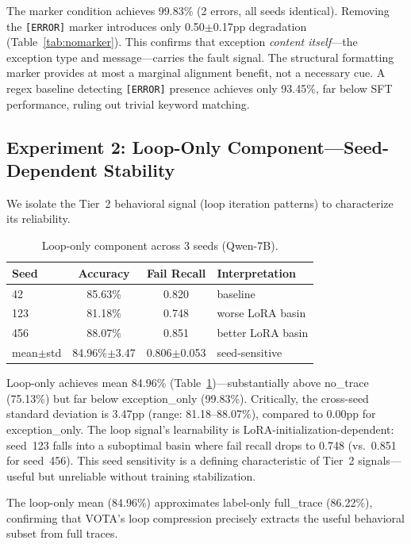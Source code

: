 \documentclass[11pt]{article}
\begin{document}
The marker condition achieves 99.83\% (2 errors, all seeds identical). Removing the \texttt{[ERROR]} marker introduces only 0.50$\pm$0.17pp degradation (Table~\ref{tab:nomarker}). This confirms that exception \emph{content itself}---the exception type and message---carries the fault signal. The structural formatting marker provides at most a marginal alignment benefit, not a necessary cue. A regex baseline detecting \texttt{[ERROR]} presence achieves only 93.45\%, far below SFT performance, ruling out trivial keyword matching.

\subsection{Experiment 2: Loop-Only Component---Seed-Dependent Stability}

We isolate the Tier~2 behavioral signal (loop iteration patterns) to characterize its reliability.

\begin{table}[h]
\centering
\caption{Loop-only component across 3 seeds (Qwen-7B).}
\label{tab:loop}
\begin{tabular}{lccl}
\toprule
Seed & Accuracy & Fail Recall & Interpretation \\
\midrule
42 & 85.63\% & 0.820 & baseline \\
123 & 81.18\% & 0.748 & worse LoRA basin \\
456 & 88.07\% & 0.851 & better LoRA basin \\
\midrule
mean$\pm$std & 84.96\%$\pm$3.47 & 0.806$\pm$0.053 & seed-sensitive \\
\bottomrule
\end{tabular}
\end{table}

Loop-only achieves mean 84.96\% (Table~\ref{tab:loop})---substantially above no\_trace (75.13\%) but far below exception\_only (99.83\%). Critically, the cross-seed standard deviation is 3.47pp (range: 81.18--88.07\%), compared to 0.00pp for exception\_only. The loop signal's learnability is LoRA-initialization-dependent: seed~123 falls into a suboptimal basin where fail recall drops to 0.748 (vs.\ 0.851 for seed~456). This seed sensitivity is a defining characteristic of Tier~2 signals---useful but unreliable without training stabilization.

The loop-only mean (84.96\%) approximates label-only full\_trace (86.22\%), confirming that VOTA's loop compression precisely extracts the useful behavioral subset from full traces.
\end{document}
